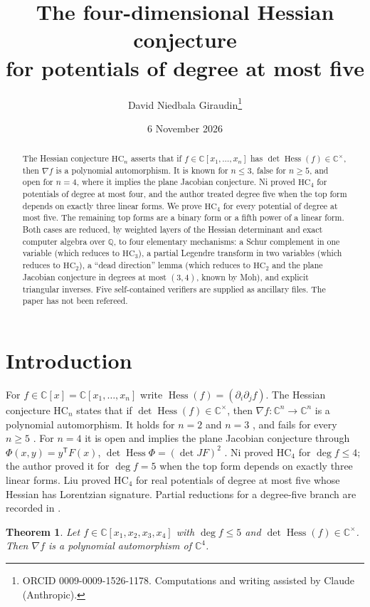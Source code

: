 \documentclass[11pt]{article}
\title{The four-dimensional Hessian conjecture\\ for potentials of degree at most five}
\author{David Niedbala Giraudin\thanks{ORCID 0009-0009-1526-1178. Computations and writing assisted by Claude (Anthropic).}}
\date{6 November 2026}
\newtheorem{theorem}{Theorem}
\theoremstyle{remark}
\newcommand{\C}{\mathbb{C}}
\newcommand{\Q}{\mathbb{Q}}
\newcommand{\Hess}{\operatorname{Hess}}
\newcommand{\HC}{\mathrm{HC}}
\begin{document}
\maketitle

\begin{abstract}
The Hessian conjecture $\HC_n$ asserts that if $f\in\C[x_1,\dots,x_n]$ has $\det\Hess(f)\in\C^\times$, then $\nabla f$ is a polynomial automorphism. It is known for $n\le3$, false for $n\ge5$, and open for $n=4$, where it implies the plane Jacobian conjecture. Ni proved $\HC_4$ for potentials of degree at most four, and the author treated degree five when the top form depends on exactly three linear forms. We prove $\HC_4$ for every potential of degree at most five. The remaining top forms are a binary form or a fifth power of a linear form. Both cases are reduced, by weighted layers of the Hessian determinant and exact computer algebra over $\Q$, to four elementary mechanisms: a Schur complement in one variable (which reduces to $\HC_3$), a partial Legendre transform in two variables (which reduces to $\HC_2$), a ``dead direction'' lemma (which reduces to $\HC_2$ and the plane Jacobian conjecture in degrees at most $(3,4)$, known by Moh), and explicit triangular inverses. Five self-contained verifiers are supplied as ancillary files. The paper has not been refereed.
\end{abstract}

\section{Introduction}
For $f\in\C[x]=\C[x_1,\dots,x_n]$ write $\Hess(f)=(\partial_i\partial_jf)$. The Hessian conjecture $\HC_n$ \cite{Meng06} states that if $\det\Hess(f)\in\C^\times$, then $\nabla f\colon\C^n\to\C^n$ is a polynomial automorphism. It holds for $n=2$ \cite{Dillen} and $n=3$ \cite{deBondt3}, and fails for every $n\ge5$ \cite{MengYang}. For $n=4$ it is open and implies the plane Jacobian conjecture through $\Phi(x,y)=y^{\mathsf T}F(x)$, $\det\Hess\Phi=(\det JF)^2$ \cite{MengYang,Ni}. Ni \cite{Ni} proved $\HC_4$ for $\deg f\le4$; the author \cite{NGtern} proved it for $\deg f=5$ when the top form depends on exactly three linear forms. Liu \cite{Liu} proved $\HC_4$ for real potentials of degree at most five whose Hessian has Lorentzian signature. Partial reductions for a degree-five branch are recorded in \cite{EP}.

\begin{theorem}\label{thm:main}
Let $f\in\C[x_1,x_2,x_3,x_4]$ with $\deg f\le5$ and $\det\Hess(f)\in\C^\times$. Then $\nabla f$ is a polynomial automorphism of $\C^4$.
\end{theorem}
\end{document}
